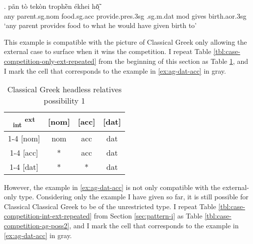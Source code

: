\exg. pãn {tò tekòn} trophḕn ékhei hō̃ͅ  \\
any parent.\ac{sg}.\ac{nom} food.\ac{sg}.\ac{acc} provide.\ac{pres}.3\ac{sg}\scsub{[dat]} .\ac{sg}.\ac{m}.\ac{dat} \ac{mod} {gives birth}.\ac{aor}.3\ac{sg}\scsub{[acc]}\\
`any parent provides food to what he would have given birth to' \label{ex:ag-dat-acc}

This example is compatible with the picture of Classical Greek only allowing the external case to surface when it wins the competition. I repeat Table \ref{tbl:case-competition-only-ext-repeated} from the beginning of this section as Table \ref{tbl:case-competition-ag-poss1}, and I mark the cell that corresponds to the example in \ref{ex:ag-dat-acc} in gray.

\begin{table}[ht]
  \center
  \caption{Classical Greek headless relatives possibility 1}
  \begin{tabular}{c|c|c|c}
    \toprule
    \textsubscript{\ac{int}} \textsuperscript{\ac{ext}}
           & [\ac{nom}]
           & [\ac{acc}]
           & [\ac{dat}]
           \\ \cmidrule{1-4}
       [\ac{nom}]
           & \ac{nom}
           & \ac{acc}
           & \ac{dat}
           \\ \cmidrule{1-4}
       [\ac{acc}]
           & *
           & \ac{acc}
           & \cellcolor{LG}\ac{dat}
           \\ \cmidrule{1-4}
       [\ac{dat}]
           & *
           & *
           & \ac{dat}
           \\
     \bottomrule
  \end{tabular}
    \label{tbl:case-competition-ag-poss1}
\end{table}

However, the example in \ref{ex:ag-dat-acc} is not only compatible with the external-only type. Considering only the example I have given so far, it is still possible for Classical Classical Greek to be of the unrestricted type. I repeat Table \ref{tbl:case-competition-int-ext-repeated} from Section \ref{sec:pattern-i} as Table \ref{tbl:case-competition-ag-poss2}, and I mark the cell that corresponds to the example in \ref{ex:ag-dat-acc} in gray.

